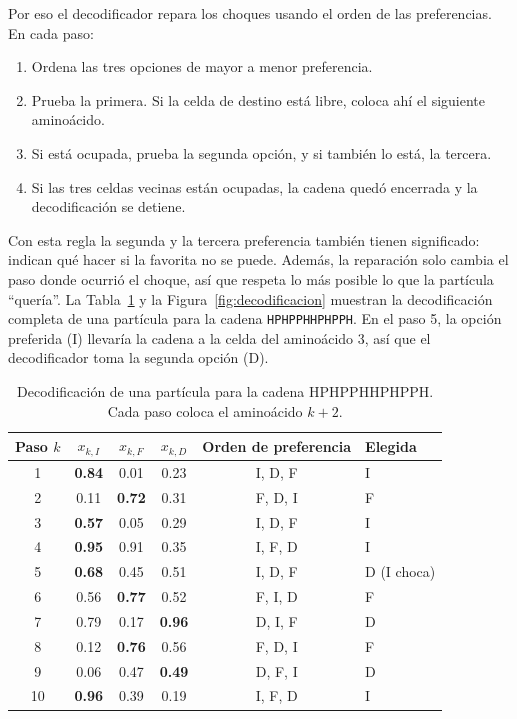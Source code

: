 Por eso el decodificador repara los choques usando el orden de las preferencias. En cada paso:
\begin{enumerate}
    \item Ordena las tres opciones de mayor a menor preferencia.
    \item Prueba la primera. Si la celda de destino está libre, coloca ahí el siguiente aminoácido.
    \item Si está ocupada, prueba la segunda opción, y si también lo está, la tercera.
    \item Si las tres celdas vecinas están ocupadas, la cadena quedó encerrada y la decodificación se detiene.
\end{enumerate}
Con esta regla la segunda y la tercera preferencia también tienen significado: indican qué hacer si la favorita no se puede. Además, la reparación solo cambia el paso donde ocurrió el choque, así que respeta lo más posible lo que la partícula ``quería''. La Tabla~\ref{tab:decodificacion} y la Figura~\ref{fig:decodificacion} muestran la decodificación completa de una partícula para la cadena \texttt{HPHPPHHPHPPH}. En el paso 5, la opción preferida (I) llevaría la cadena a la celda del aminoácido 3, así que el decodificador toma la segunda opción (D).

\begin{table}[H]
\centering
\caption{Decodificación de una partícula para la cadena HPHPPHHPHPPH. Cada paso coloca el aminoácido $k+2$.}
\label{tab:decodificacion}
\small
\begin{tabular}{cccccl}
\toprule
Paso $k$ & $x_{k,I}$ & $x_{k,F}$ & $x_{k,D}$ & Orden de preferencia & Elegida \\
\midrule
1  & \textbf{0.84} & 0.01 & 0.23 & I, D, F & I \\
2  & 0.11 & \textbf{0.72} & 0.31 & F, D, I & F \\
3  & \textbf{0.57} & 0.05 & 0.29 & I, D, F & I \\
4  & \textbf{0.95} & 0.91 & 0.35 & I, F, D & I \\
5  & \textbf{0.68} & 0.45 & 0.51 & I, D, F & D (I choca) \\
6  & 0.56 & \textbf{0.77} & 0.52 & F, I, D & F \\
7  & 0.79 & 0.17 & \textbf{0.96} & D, I, F & D \\
8  & 0.12 & \textbf{0.76} & 0.56 & F, D, I & F \\
9  & 0.06 & 0.47 & \textbf{0.49} & D, F, I & D \\
10 & \textbf{0.96} & 0.39 & 0.19 & I, F, D & I \\
\bottomrule
\end{tabular}
\end{table}

